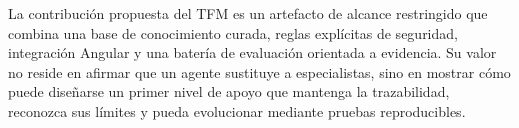 La contribución propuesta del TFM es un artefacto de alcance restringido que
combina una base de conocimiento curada, reglas explícitas de seguridad,
integración Angular y una batería de evaluación orientada a evidencia. Su valor
no reside en afirmar que un agente sustituye a especialistas, sino en mostrar
cómo puede diseñarse un primer nivel de apoyo que mantenga la trazabilidad,
reconozca sus límites y pueda evolucionar mediante pruebas reproducibles.

